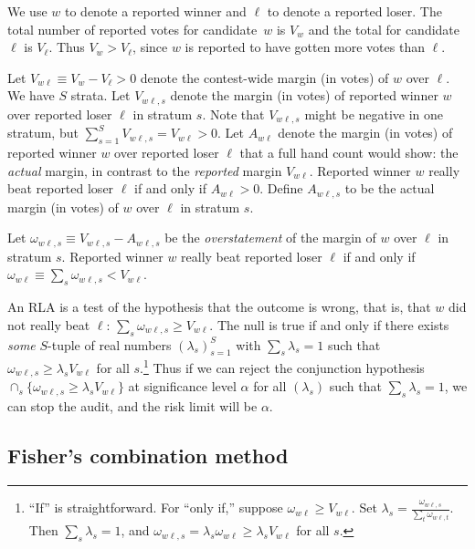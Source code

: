 \documentclass[runningheads]{llncs}
\begin{document}
We use $w$ to denote a reported winner and $\ell$ to denote a reported loser.
The total number of reported votes for candidate~$w$ is $V_w$ 
and the total for candidate~$\ell$ is $V_\ell$.
Thus $V_w > V_\ell$, since $w$ is reported to have gotten more votes than $\ell$.

Let $V_{w\ell} \equiv V_w - V_\ell > 0$ denote the contest-wide margin (in votes) of 
$w$ over  $\ell$.
We have $S$ strata.
Let $V_{w\ell,s}$ denote the margin (in votes) of reported winner $w$ over reported loser $\ell$
in stratum $s$. 
Note that $V_{w\ell,s}$ might be negative in one stratum, but $\sum_{s=1}^S V_{w\ell,s} = V_{w\ell} > 0$.
Let $A_{w\ell}$ denote the margin (in votes) of reported winner $w$ over reported loser $\ell$ that  a full hand count would show: the \emph{actual} margin, in contrast to the \emph{reported} margin $V_{w\ell}$.
Reported winner $w$ really beat reported loser $\ell$ if and only if $A_{w\ell} > 0$.
Define $A_{w\ell,s}$ to be the actual margin (in votes) of $w$ over $\ell$ in stratum $s$.

Let $\omega_{w\ell,s} \equiv V_{w\ell,s} - A_{w\ell,s}$ be the \emph{overstatement}
of the margin of $w$ over $\ell$ in stratum $s$.
Reported winner $w$ really beat reported loser 
$\ell$ if and only if $\omega_{w\ell} \equiv \sum_s \omega_{w\ell,s} < V_{w\ell}$.

An RLA is a test of the hypothesis that the outcome is wrong, that is, that $w$ did not really beat $\ell$:
$\sum_s \omega_{w\ell, s} \ge V_{w\ell}$.
The null is true if and only if there exists \textit{some} $S$-tuple of real numbers $(\lambda_s)_{s=1}^S$ with $\sum_s \lambda_s = 1$ such that $\omega_{w\ell, s} \ge \lambda_s V_{w\ell}$ for all $s$.\footnote{%
  ``If'' is straightforward. For ``only if,'' suppose $\omega_{w\ell} \ge V_{w\ell}$. Set $\lambda_s = \frac{\omega_{w\ell, s}}{\sum_t \omega_{w\ell, t}}$. Then $\sum_s \lambda_s = 1$, and $\omega_{w\ell, s} = \lambda_s \omega_{w\ell} \ge \lambda_s V_{w\ell}$ for all $s$.
}
Thus if we can reject the conjunction hypothesis $\cap_s \{ \omega_{w\ell,s} \ge \lambda_s V_{w\ell} \}$ at significance level $\alpha$ for all $(\lambda_s)$ such that $\sum_s \lambda_s = 1$, we can stop the audit, and the risk limit will be $\alpha$.

\subsection{Fisher's combination method}
\end{document}

